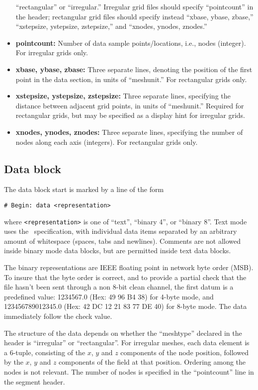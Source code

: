 \begin{itemize}
   ``rectangular'' or
   ``irregular.''  Irregular grid files should specify ``pointcount''
   in the header; rectangular grid files should specify instead
   ``xbase, ybase, zbase,'' ``xstepsize, ystepsize, zstepsize,'' and
   ``xnodes, ynodes, znodes.''
\item {\bf pointcount:} Number of data sample points/locations, i.e.,
   nodes (integer).  For irregular grids only.
\item {\bf xbase, ybase, zbase:} Three separate lines, denoting the
   position of the first point in the data section, in units of
   ``meshunit.''  For rectangular grids only.
\item {\bf xstepsize, ystepsize, zstepsize:} Three separate lines,
   specifying the distance between adjacent grid points, in units
   of ``meshunit.''  Required for rectangular grids, but may be
   specified as a display hint for irregular grids.
\item {\bf xnodes, ynodes, znodes:} Three separate lines, specifying
   the number of nodes along each axis (integers).  For
   rectangular grids only.
\end{itemize}

\subsection{Data block}\label{sec:ovfdatablock}
The data block start is marked by a line of the form
\begin{verbatim}
# Begin: data <representation>
\end{verbatim}
where \texttt{<representation>} is one of ``text'', ``binary 4'', or
``binary 8''.  Text mode uses the \ASCII\ specification, with
individual data items separated by an arbitrary amount of whitespace
(spaces, tabs and newlines).  Comments are not allowed inside binary
mode data blocks, but are permitted inside text data blocks.

The binary representations are IEEE floating point in network byte
order (MSB).  To insure that the byte order is correct, and to provide
a partial check that the file hasn't been sent through a non 8-bit
clean channel, the first datum is a predefined value: 1234567.0 (Hex:
49 96 B4 38) for 4-byte mode, and 123456789012345.0 (Hex: 42 DC 12 21
83 77 DE 40) for 8-byte mode.  The data immediately follow the check
value.

The structure of the data depends on whether the ``meshtype'' declared
in the header is ``irregular'' or ``rectangular''.  For irregular
meshes, each data element is a 6-tuple, consisting of the $x$, $y$ and
$z$ components of the node position, followed by the $x$, $y$ and $z$
components of the field at that position.  Ordering among the nodes is
not relevant.  The number of nodes is specified in the ``pointcount''
line in the segment header.

